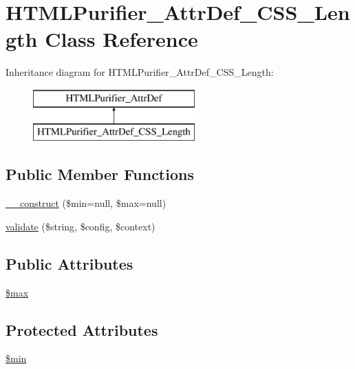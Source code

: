 \hypertarget{classHTMLPurifier__AttrDef__CSS__Length}{\section{H\+T\+M\+L\+Purifier\+\_\+\+Attr\+Def\+\_\+\+C\+S\+S\+\_\+\+Length Class Reference}
\label{classHTMLPurifier__AttrDef__CSS__Length}
}
Inheritance diagram for H\+T\+M\+L\+Purifier\+\_\+\+Attr\+Def\+\_\+\+C\+S\+S\+\_\+\+Length\+:\begin{figure}[H]
\begin{center}
\leavevmode
\includegraphics[height=2.000000cm]{classHTMLPurifier__AttrDef__CSS__Length}
\end{center}
\end{figure}
\subsection*{Public Member Functions}
\begin{DoxyCompactItemize}
\item 
\hyperlink{classHTMLPurifier__AttrDef__CSS__Length_a4d1746fdb8c7e098d82e19890ad8fe2b}{\+\_\+\+\_\+construct} (\$min=null, \$max=null)
\item 
\hyperlink{classHTMLPurifier__AttrDef__CSS__Length_ad02120ae395d4bba9a978630b7024cbb}{validate} (\$string, \$config, \$context)
\end{DoxyCompactItemize}
\subsection*{Public Attributes}
\begin{DoxyCompactItemize}
\item 
\hyperlink{classHTMLPurifier__AttrDef__CSS__Length_a5c799d594d0be52515ba3f1855339254}{\$max}
\end{DoxyCompactItemize}
\subsection*{Protected Attributes}
\begin{DoxyCompactItemize}
\item 
\hyperlink{classHTMLPurifier__AttrDef__CSS__Length_ab132213a1ab8151d0c2df78a3c446240}{\$min}
\end{DoxyCompactItemize}
